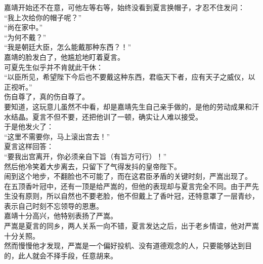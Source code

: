 \begin{multicols}{\theparacolNo}
嘉靖开始还不在意，可他左等右等，始终没看到夏言换帽子，才忍不住发问：\\

“我上次给你的帽子呢？”\\

“尚在家中。”\\

“为何不戴？”\\

“我是朝廷大臣，怎么能戴那种东西？！”\\

嘉靖的脸发白了，他尴尬地盯着夏言。\\

可夏先生似乎并不肯就此干休：\\

“以臣所见，希望陛下今后也不要戴这种东西，君临天下者，应有天子之威仪，以正视听。”\\

伤自尊了，真的伤自尊了。\\

要知道，这玩意儿虽然不中看，却是嘉靖先生自己亲手做的，是他的劳动成果和汗水结晶。夏言不但不要，还把他训了一顿，确实让人难以接受。\\

于是他发火了：\\

“这里不需要你，马上滚出宫去！”\\

夏言这样回答：\\

“要我出宫离开，你必须亲自下旨（有旨方可行）！”\\

然后他冷笑着大步离去，只留下了气得发抖的皇帝陛下。\\

闹到这个地步，不翻脸也不可能了，而在这君臣矛盾的关键时刻，严嵩出现了。\\

在五顶香叶冠中，还有一顶是给严嵩的，但他的表现却与夏言完全不同。由于严先生没有原则，所以自然也不要老脸，他不但戴上了香叶冠，还特意罩了一层青纱，表示自己时刻不忘领导的恩惠。\\

嘉靖十分高兴，他特别表扬了严嵩。\\

严嵩是夏言的同乡，两人关系一向不错，夏言发达之后，出于老乡情谊，他对严嵩十分关照。\\

然而慢慢他才发现，严嵩是一个偏好投机、没有道德观念的人，只要能够达到目的，此人就会不择手段，任意胡来。\\


\end{multicols}
